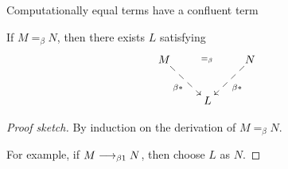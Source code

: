 \begin{frame}{Computationally equal terms have a confluent term}

  \begin{corollary}
    If $M =_\beta N$, then there exists $L$ satisfying
  \[
    \xymatrix{
      M \ar@{-->}[rd]_{\beta*} \ar@{}[rr]|{=_\beta} & & N \ar@{-->}[ld]^{\beta*} \\
      & L
    }
  \]
  \label{coro:computational-meanting-confluence}
  \end{corollary}
  \begin{proof}[Proof sketch]
    By induction on the derivation of $M =_\beta N$. 

    For example, if $M \longrightarrow_{\beta1} N$, then choose $L$ as $N$. 
  \end{proof}

\end{frame}

